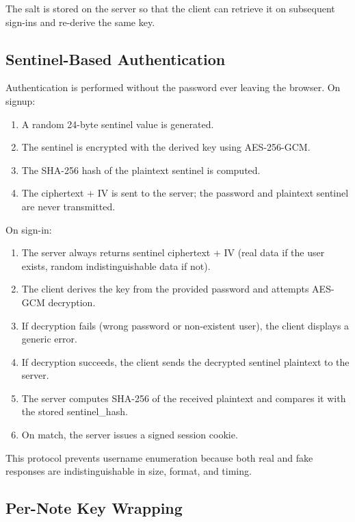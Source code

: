 The salt is stored on the server so that the client can retrieve it on subsequent sign-ins and re-derive the same key.

\subsection{Sentinel-Based Authentication}

Authentication is performed without the password ever leaving the browser. On signup:
\begin{enumerate}
    \item A random 24-byte sentinel value is generated.
    \item The sentinel is encrypted with the derived key using AES-256-GCM.
    \item The SHA-256 hash of the plaintext sentinel is computed.
    \item The ciphertext + IV is sent to the server; the password and plaintext sentinel are never transmitted.
\end{enumerate}

On sign-in:
\begin{enumerate}
    \item The server always returns sentinel ciphertext + IV (real data if the user exists, random indistinguishable data if not).
    \item The client derives the key from the provided password and attempts AES-GCM decryption.
    \item If decryption fails (wrong password or non-existent user), the client displays a generic error.
    \item If decryption succeeds, the client sends the decrypted sentinel plaintext to the server.
    \item The server computes SHA-256 of the received plaintext and compares it with the stored sentinel\_hash.
    \item On match, the server issues a signed session cookie.
\end{enumerate}

This protocol prevents username enumeration because both real and fake responses are indistinguishable in size, format, and timing.

\subsection{Per-Note Key Wrapping}

